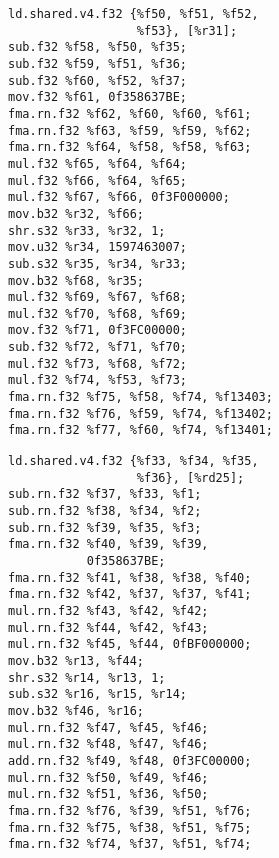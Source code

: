 \begin{figure}
    \begin{minipage}{0.5\textwidth}
        \centering
        \begin{verbatim}
ld.shared.v4.f32 {%f50, %f51, %f52,
                  %f53}, [%r31];
sub.f32 %f58, %f50, %f35;
sub.f32 %f59, %f51, %f36;
sub.f32 %f60, %f52, %f37;
mov.f32 %f61, 0f358637BE;
fma.rn.f32 %f62, %f60, %f60, %f61;
fma.rn.f32 %f63, %f59, %f59, %f62;
fma.rn.f32 %f64, %f58, %f58, %f63;
mul.f32 %f65, %f64, %f64;
mul.f32 %f66, %f64, %f65;
mul.f32 %f67, %f66, 0f3F000000;
mov.b32 %r32, %f66;
shr.s32 %r33, %r32, 1;
mov.u32 %r34, 1597463007;
sub.s32 %r35, %r34, %r33;
mov.b32 %f68, %r35;
mul.f32 %f69, %f67, %f68;
mul.f32 %f70, %f68, %f69;
mov.f32 %f71, 0f3FC00000;
sub.f32 %f72, %f71, %f70;
mul.f32 %f73, %f68, %f72;
mul.f32 %f74, %f53, %f73;
fma.rn.f32 %f75, %f58, %f74, %f13403;
fma.rn.f32 %f76, %f59, %f74, %f13402;
fma.rn.f32 %f77, %f60, %f74, %f13401;
        \end{verbatim}
        \label{nvidia:nbody:ptxnvcc-qrsqrt}
    \end{minipage}
    \begin{minipage}{0.5\textwidth}
        \centering
        \begin{verbatim}
ld.shared.v4.f32 {%f33, %f34, %f35,
                  %f36}, [%rd25];
sub.rn.f32 %f37, %f33, %f1;
sub.rn.f32 %f38, %f34, %f2;
sub.rn.f32 %f39, %f35, %f3;
fma.rn.f32 %f40, %f39, %f39,
           0f358637BE;
fma.rn.f32 %f41, %f38, %f38, %f40;
fma.rn.f32 %f42, %f37, %f37, %f41;
mul.rn.f32 %f43, %f42, %f42;
mul.rn.f32 %f44, %f42, %f43;
mul.rn.f32 %f45, %f44, 0fBF000000;
mov.b32 %r13, %f44;
shr.s32 %r14, %r13, 1;
sub.s32 %r16, %r15, %r14;
mov.b32 %f46, %r16;
mul.rn.f32 %f47, %f45, %f46;
mul.rn.f32 %f48, %f47, %f46;
add.rn.f32 %f49, %f48, 0f3FC00000;
mul.rn.f32 %f50, %f49, %f46;
mul.rn.f32 %f51, %f36, %f50;
fma.rn.f32 %f76, %f39, %f51, %f76;
fma.rn.f32 %f75, %f38, %f51, %f75;
fma.rn.f32 %f74, %f37, %f51, %f74;
        \end{verbatim}
        \label{nvidia:nbody:ptxsycl}
    \end{minipage}
\end{figure}
